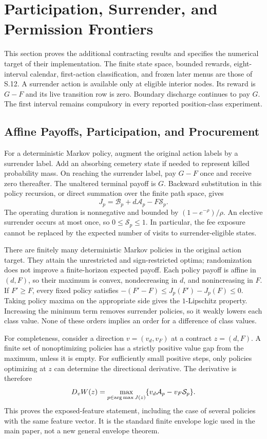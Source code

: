 \section{Participation, Surrender, and Permission Frontiers}
\label{sec:s13}
This section proves the additional contracting results and specifies the numerical target of their implementation. The finite state space, bounded rewards, eight-interval calendar, first-action classification, and frozen later menus are those of S.12. A surrender action is available only at eligible interior nodes. Its reward is $G-F$ and its live transition row is zero. Boundary discharge continues to pay $G$. The first interval remains compulsory in every reported position-class experiment.

\subsection{Affine Payoffs, Participation, and Procurement}
For a deterministic Markov policy, augment the original action labels by a surrender label. Add an absorbing cemetery state if needed to represent killed probability mass. On reaching the surrender label, pay $G-F$ once and receive zero thereafter. The unaltered terminal payoff is $G$. Backward substitution in this policy recursion, or direct summation over the finite path space, gives
\[
 J_p=\mathcal B_p+d\mathcal A_p-F\mathcal S_p.
\]
The operating duration is nonnegative and bounded by $(1-e^{-\rho})/\rho$. An elective surrender occurs at most once, so $0\leq\mathcal S_p\leq1$. In particular, the fee exposure cannot be replaced by the expected number of visits to surrender-eligible states.

There are finitely many deterministic Markov policies in the original action target. They attain the unrestricted and sign-restricted optima; randomization does not improve a finite-horizon expected payoff. Each policy payoff is affine in $(d,F)$, so their maximum is convex, nondecreasing in $d$, and nonincreasing in $F$. If $F'\geq F$, every fixed policy satisfies $-(F'-F)\leq J_p(F')-J_p(F)\leq0$. Taking policy maxima on the appropriate side gives the $1$-Lipschitz property. Increasing the minimum term removes surrender policies, so it weakly lowers each class value. None of these orders implies an order for a difference of class values.

For completeness, consider a direction $v=(v_d,v_F)$ at a contract $z=(d,F)$. A finite set of nonoptimizing policies has a strictly positive value gap from the maximum, unless it is empty. For sufficiently small positive steps, only policies optimizing at $z$ can determine the directional derivative. The derivative is therefore
\[
 D_vW(z)=\max_{p\in\operatorname*{arg\,max} J(z)}\{v_d\mathcal A_p-v_F\mathcal S_p\}.
\]
This proves the exposed-feature statement, including the case of several policies with the same feature vector. It is the standard finite envelope logic used in the main paper, not a new general envelope theorem.

